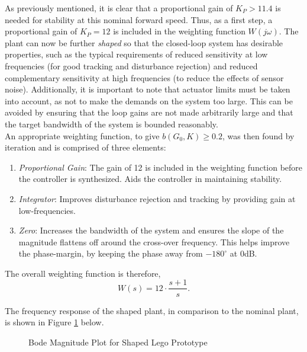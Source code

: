 As previously mentioned, it is clear that a proportional gain of $K_P>11.4$ is needed for stability at this nominal forward speed. Thus, as a first step, a proportional gain of $K_P=12$ is included in the weighting function $W(j\omega)$. The plant can now be further \textit{shaped} so that the closed-loop system has desirable properties, such as the typical requirements of reduced sensitivity at low frequencies (for good tracking and disturbance rejection) and reduced complementary sensitivity at high frequencies (to reduce the effects of sensor noise). Additionally, it is important to note that actuator limits must be taken into account, as not to make the demands on the system too large. This can be avoided by ensuring that the loop gains are not made arbitrarily large and that the target bandwidth of the system is bounded reasonably.  \\

An appropriate weighting function, to give $b(G_0,K) \geq 0.2$, was then found by iteration and is comprised of three elements:

\begin{enumerate}
\item{\textit{Proportional Gain}: The gain of 12 is included in the weighting function before the controller is synthesized. Aids the controller in maintaining stability.}
\item{\textit{Integrator}: Improves disturbance rejection and tracking by providing gain at low-frequencies.}
\item{\textit{Zero}: Increases the bandwidth of the system and ensures the slope of the magnitude flattens off around the cross-over frequency. This helps improve the phase-margin, by keeping the phase away from $-180^{\circ}$ at 0dB.}
\end{enumerate}

The overall weighting function is therefore,
\begin{equation*}
W(s) = 12 \cdot \frac{s + 1}{s}.
\end{equation*}

The frequency response of the shaped plant, in comparison to the nominal plant, is shown in Figure \ref{fig:bodeLegoShaped} below.

\begin{figure}[H]
	\centering
	\caption{Bode Magnitude Plot for Shaped Lego Prototype}
	\label{fig:bodeLegoShaped}
\end{figure}

